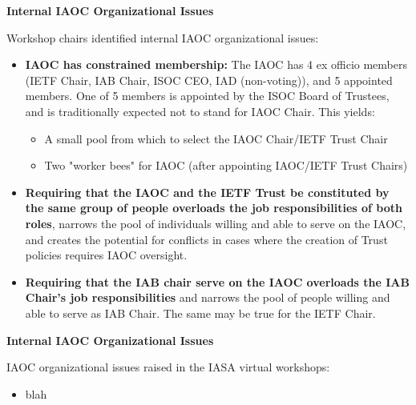 \documentclass[helvetica]{seminar}
\newcommand{\heading}[1]{%
  \begin{center} 
    \large\bf 
    #1 
  \end{center} 
  \vspace{.4 in}}
\begin{document}
\begin{slide}
\heading{Internal IAOC Organizational Issues}

Workshop chairs identified internal IAOC organizational issues:
{\footnotesize
\begin{itemize}
\item \textbf{IAOC has constrained membership:} The IAOC has 4 ex
  officio members (IETF Chair, IAB Chair, ISOC CEO, IAD (non-voting)),
  and 5 appointed members.  One of 5 members is appointed by the ISOC
  Board of Trustees, and is traditionally expected not to stand for
  IAOC Chair.  This yields:
  \begin{itemize}
  \item A small pool from which to select the IAOC Chair/IETF Trust
    Chair
  \item Two "worker bees" for IAOC (after appointing IAOC/IETF Trust
    Chairs)
  \end{itemize}
\item \textbf{Requiring that the IAOC and the IETF Trust be
  constituted by the same group of people overloads the job
  responsibilities of both roles}, narrows the pool of individuals
  willing and able to serve on the IAOC, and creates the potential for
  conflicts in cases where the creation of Trust policies requires
  IAOC oversight.
\item \textbf{Requiring that the IAB chair serve on the IAOC overloads
  the IAB Chair's job responsibilities} and narrows the pool of people
  willing and able to serve as IAB Chair.  The same may be true for
  the IETF Chair.
\end{itemize}
}

\end{slide}

\begin{slide}
\heading{Internal IAOC Organizational Issues}

IAOC organizational issues raised in the IASA virtual workshops:
\begin{itemize}
\item blah
\end{itemize}

\end{slide}
\end{document}
